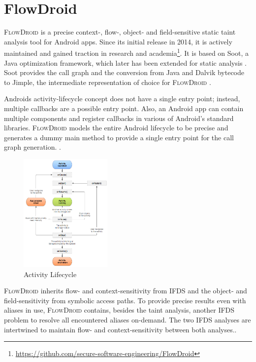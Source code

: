 \documentclass[../draft.tex]{subfiles}
\begin{document}
    \section{FlowDroid}\label{s:flowdroid}
    \textsc{FlowDroid} is a precise context-, flow-, object- and field-sensitive static taint analysis tool for Android apps\cite{Arzt2014}. 
    Since its initial release in 2014, it is actively maintained and gained traction in research and academia\footnote{\url{https://github.com/secure-software-engineering/FlowDroid}}. 
    It is based on Soot, a Java optimization framework, which later has been extended for static analysis \cite{Lam2011}. 
    Soot provides the call graph and the conversion from Java and Dalvik bytecode to Jimple, the intermediate representation of choice for \textsc{FlowDroid} \cite{Arzt2017PhD}.

    Androids activity-lifecycle concept does not have a single entry point; instead, multiple callbacks are a possible entry point. 
    Also, an Android app can contain multiple components and register callbacks in various of Android's standard libraries. 
    \textsc{FlowDroid} models the entire Android lifecycle to be precise and generates a dummy main method to provide a single entry point for the call graph generation. 
    \cite{Arzt2014}.

    \begin{figure}[ht]
        \centering
        \includegraphics[width=0.4\textwidth]{figs/activity_lifecycle.png}
        \caption{Activity Lifecycle\protect\footnotemark}
        \label{f:activity}
    \end{figure}

    \textsc{FlowDroid} inherits flow- and context-sensitivity from IFDS and the object- and field-sensitivity from symbolic access paths. To provide precise results even with aliases in use, \textsc{FlowDroid} contains, besides the taint analysis, another IFDS problem to resolve all encountered aliases on-demand. The two IFDS analyses are intertwined to maintain flow- and context-sensitivity between both analyses.\cite{Arzt2014}.
\end{document}
